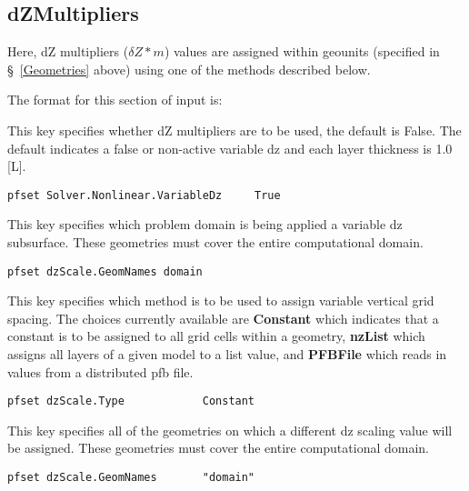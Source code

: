 \subsection{dZMultipliers}
\label{dZ Multipliers}

Here, dZ multipliers ($\delta Z * m$) values are assigned within geounits (specified in
\S~\ref{Geometries} above) using one of the methods described below.

The format for this section of input is:

{
This key specifies whether dZ multipliers are to be used, the default is False.
The default indicates a false or non-active variable dz and each layer thickness is 1.0 [L].
}
\begin{display}\begin{verbatim}
pfset Solver.Nonlinear.VariableDz     True
\end{verbatim}\end{display}

{
This key specifies which problem domain is being applied a variable dz subsurface.
These geometries must cover the entire computational domain.
}
\begin{display}\begin{verbatim}
pfset dzScale.GeomNames domain
\end{verbatim}\end{display}


{
This key specifies which method is to be used to assign variable vertical grid spacing.  The choices currently
available are {\bf Constant} which indicates that a constant is to be
assigned to all grid cells within a geometry, {\bf nzList} which assigns all layers of a given model to a list value,
and {\bf PFBFile} which reads in values from a distributed pfb file.
}
\begin{display}\begin{verbatim}
pfset dzScale.Type            Constant
\end{verbatim}\end{display}

{
This key specifies all of the geometries on which a different dz scaling value will be 
assigned.  These geometries must cover the entire computational domain.
}
\begin{display}\begin{verbatim}
pfset dzScale.GeomNames       "domain"
\end{verbatim}\end{display}

